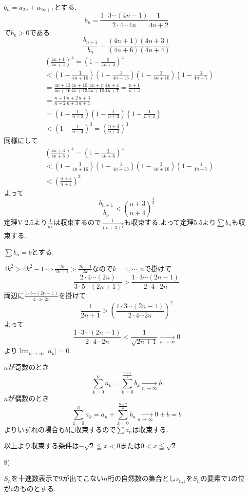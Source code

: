 \documentclass{jsarticle}
\begin{document}
$b_n=a_{2n}+a_{2n+1}$とする.
\[b_n = \frac{1\cdot 3 \cdots (4n-1)}{2\cdot 4\cdots 4n}\frac{1}{4n+2}\]
で$b_n>0$である.
\[\frac{b_{n+1}}{b_n}=\frac{(4n+1)(4n+3)}{(4n+6)(4n+4)}\]
\begin{align*}
&(\frac{4n+1}{4n+4})^4=(1-\frac{3}{4n+4})^4\\
&< (1-\frac{3}{4n+16})(1-\frac{3}{4n+13})(1-\frac{3}{4n+10})(1-\frac{3}{4n+7})\\
&= \frac{4n+13}{4n+16}\frac{4n+10}{4n+13}\frac{4n+7}{4n+10}\frac{4n+4}{4n+7}=\frac{n+1}{n+4}\\
&=\frac{n+1}{n+2}\frac{n+2}{n+3}\frac{n+3}{n+4}\\
&=(1-\frac{1}{n+2})(1-\frac{1}{n+3})(1-\frac{1}{n+4})\\
&< (1-\frac{1}{n+4})^3=(\frac{n+3}{n+4})^3
\end{align*}
同様にして
\begin{align*}
&(\frac{4n+3}{4n+6})^4=(1-\frac{3}{4n+6})^4\\
&< (1-\frac{3}{4n+16})(1-\frac{3}{4n+13})(1-\frac{3}{4n+10})(1-\frac{3}{4n+7})\\
&<(\frac{n+3}{n+4})^3
\end{align*}
よって
\[\frac{b_{n+1}}{b_n}<(\frac{n+3}{n+4})^\frac{3}{2}\]
定理V 2.5より$\frac{1}{n^{\frac{3}{2}}}$は収束するので$\frac{1}{(n+3)^{\frac{3}{2}}}$も収束する.よって定理5.5より$\sum b_n$も収束する.

$\sum b_n=b$とする.

$4k^2 > 4k^2-1\Leftrightarrow \frac{2k}{2k+1}>\frac{2k-1}{2k}$なので$k=1,\cdots ,n$で掛けて
\[\frac{2\cdot 4 \cdots (2n)}{3\cdot 5\cdots (2n+1)}
 > \frac{1\cdot 3 \cdots (2n-1)}{2\cdot 4\cdots 2n} \]
両辺に$\frac{1\cdot 3 \cdots (2n-1)}{2\cdot 4\cdots 2n}$を掛けて
\[\frac{1}{2n+1} > (\frac{1\cdot 3 \cdots (2n-1)}{2\cdot 4\cdots 2n})^2\]
よって
\[\frac{1\cdot 3 \cdots (2n-1)}{2\cdot 4\cdots 2n} < \frac{1}{\sqrt{2n+1}}\xrightarrow[n\to\infty]{}0\]
より$\displaystyle \lim_{n\to\infty}|a_n| = 0$

$n$が奇数のとき
\[\sum_{k=0}^na_k = \sum_{k=0}^{\frac{n-1}{2}}b_k\xrightarrow[n\to\infty]{}b\]
$n$が偶数のとき
\[\sum_{k=0}^na_k = a_n+\sum_{k=0}^{\frac{n-2}{2}}b_n\xrightarrow[n\to\infty]{}0+b=b\]
よりいずれの場合も$b$に収束するので$\sum a_n$は収束する.

以上より収束する条件は$-\sqrt{2}\leqq x < 0$または$0<x\leqq\sqrt{2}$

8)

$S_n$を十進数表示で$9$が出てこない$n$桁の自然数の集合とし$s_{n,i}$を$S_n$の要素で$1$の位が$i$のものとする.
\end{document}
